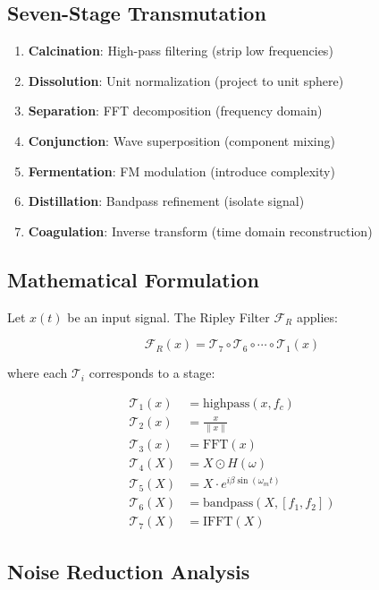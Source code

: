 \documentclass[11pt,a4paper]{article}
\begin{document}
\subsection{Seven-Stage Transmutation}

\begin{enumerate}
\item \textbf{Calcination}: High-pass filtering (strip low frequencies)
\item \textbf{Dissolution}: Unit normalization (project to unit sphere)
\item \textbf{Separation}: FFT decomposition (frequency domain)
\item \textbf{Conjunction}: Wave superposition (component mixing)
\item \textbf{Fermentation}: FM modulation (introduce complexity)
\item \textbf{Distillation}: Bandpass refinement (isolate signal)
\item \textbf{Coagulation}: Inverse transform (time domain reconstruction)
\end{enumerate}

\subsection{Mathematical Formulation}

Let $x(t)$ be an input signal. The Ripley Filter $\mathcal{F}_R$ applies:

\begin{equation}
\mathcal{F}_R(x) = \mathcal{T}_7 \circ \mathcal{T}_6 \circ \cdots \circ \mathcal{T}_1(x)
\end{equation}

where each $\mathcal{T}_i$ corresponds to a stage:

\begin{align}
\mathcal{T}_1(x) &= \text{highpass}(x, f_c) \\
\mathcal{T}_2(x) &= \frac{x}{\|x\|} \\
\mathcal{T}_3(x) &= \text{FFT}(x) \\
\mathcal{T}_4(X) &= X \odot H(\omega) \\
\mathcal{T}_5(X) &= X \cdot e^{i \beta \sin(\omega_m t)} \\
\mathcal{T}_6(X) &= \text{bandpass}(X, [f_1, f_2]) \\
\mathcal{T}_7(X) &= \text{IFFT}(X)
\end{align}

\subsection{Noise Reduction Analysis}
\end{document}
